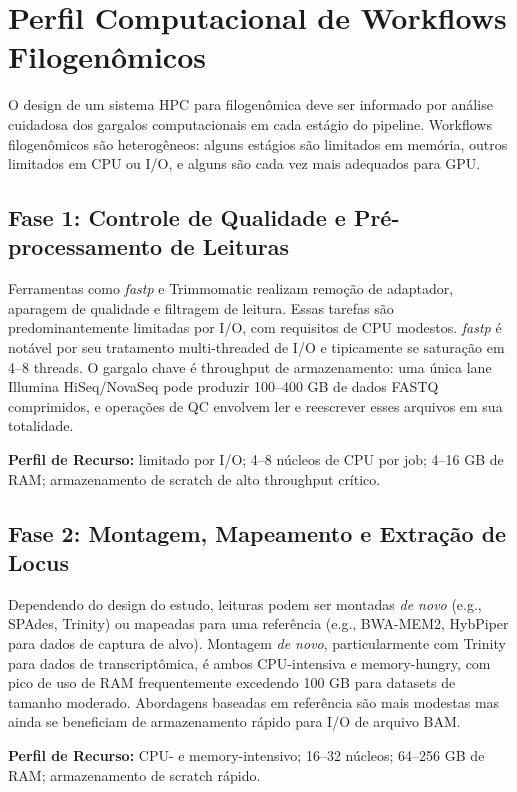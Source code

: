 \section{Perfil Computacional de Workflows Filogenômicos}

O design de um sistema HPC para filogenômica deve ser informado por análise cuidadosa dos gargalos computacionais em cada estágio do pipeline. Workflows filogenômicos são heterogêneos: alguns estágios são limitados em memória, outros limitados em CPU ou I/O, e alguns são cada vez mais adequados para GPU.

\subsection{Fase 1: Controle de Qualidade e Pré-processamento de Leituras}

Ferramentas como \textit{fastp} \parencite{chen2018} e Trimmomatic \parencite{bolger2014} realizam remoção de adaptador, aparagem de qualidade e filtragem de leitura. Essas tarefas são predominantemente limitadas por I/O, com requisitos de CPU modestos. \textit{fastp} é notável por seu tratamento multi-threaded de I/O e tipicamente se saturação em 4--8 threads. O gargalo chave é throughput de armazenamento: uma única lane Illumina HiSeq/NovaSeq pode produzir 100--400 GB de dados FASTQ comprimidos, e operações de QC envolvem ler e reescrever esses arquivos em sua totalidade.

\textbf{Perfil de Recurso:} limitado por I/O; 4--8 núcleos de CPU por job; 4--16 GB de RAM; armazenamento de scratch de alto throughput crítico.

\subsection{Fase 2: Montagem, Mapeamento e Extração de Locus}

Dependendo do design do estudo, leituras podem ser montadas \textit{de novo} (e.g., SPAdes, Trinity) ou mapeadas para uma referência (e.g., BWA-MEM2, HybPiper para dados de captura de alvo). Montagem \textit{de novo}, particularmente com Trinity para dados de transcriptômica, é ambos CPU-intensiva e memory-hungry, com pico de uso de RAM frequentemente excedendo 100 GB para datasets de tamanho moderado. Abordagens baseadas em referência são mais modestas mas ainda se beneficiam de armazenamento rápido para I/O de arquivo BAM.

\textbf{Perfil de Recurso:} CPU- e memory-intensivo; 16--32 núcleos; 64--256 GB de RAM; armazenamento de scratch rápido.

